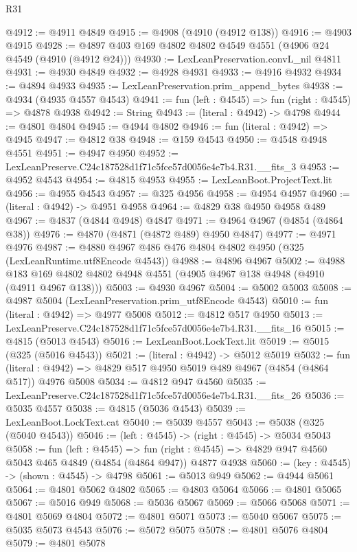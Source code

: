 \begin{lexlean}{R31}
\begin{coremodule}
@4912 := @4911 @4849
@4915 := @4908 (@4910 (@4912 @138))
@4916 := @4903 @4915
@4928 := @4897 @403 @169 @4802 @4802 @4549 @4551 (@4906 @24 @4549 (@4910 (@4912 @24)))
@4930 := LexLeanPreservation.convL_nil @4811
@4931 := @4930 @4849
@4932 := @4928 @4931
@4933 := @4916 @4932
@4934 := @4894 @4933
@4935 := LexLeanPreservation.prim_append_bytes
@4938 := @4934 (@4935 @4557 @4543)
@4941 := fun (left : @4545) => fun (right : @4545) => @4878 @4938
@4942 := String
@4943 := (literal : @4942) -> @4798
@4944 := @4801 @4804
@4945 := @4944 @4802
@4946 := fun (literal : @4942) => @4945
@4947 := @4812 @38
@4948 := @159 @4543
@4950 := @4548 @4948 @4551
@4951 := @4947 @4950
@4952 := LexLeanPreserve.C24c187528d1f71c5fce57d0056e4e7b4.R31.__fits_3
@4953 := @4952 @4543
@4954 := @4815 @4953
@4955 := LexLeanBoot.ProjectText.lit
@4956 := @4955 @4543
@4957 := @325 @4956
@4958 := @4954 @4957
@4960 := (literal : @4942) -> @4951 @4958
@4964 := @4829 @38 @4950 @4958 @489
@4967 := @4837 (@4844 @4948) @4847
@4971 := @4964 @4967 (@4854 (@4864 @38))
@4976 := @4870 (@4871 (@4872 @489) @4950 @4847)
@4977 := @4971 @4976
@4987 := @4880 @4967 @486 @476 @4804 @4802 @4950 (@325 (LexLeanRuntime.utf8Encode @4543))
@4988 := @4896 @4967
@5002 := @4988 @183 @169 @4802 @4802 @4948 @4551 (@4905 @4967 @138 @4948 (@4910 (@4911 @4967 @138)))
@5003 := @4930 @4967
@5004 := @5002 @5003
@5008 := @4987 @5004 (LexLeanPreservation.prim_utf8Encode @4543)
@5010 := fun (literal : @4942) => @4977 @5008
@5012 := @4812 @517 @4950
@5013 := LexLeanPreserve.C24c187528d1f71c5fce57d0056e4e7b4.R31.__fits_16
@5015 := @4815 (@5013 @4543)
@5016 := LexLeanBoot.LockText.lit
@5019 := @5015 (@325 (@5016 @4543))
@5021 := (literal : @4942) -> @5012 @5019
@5032 := fun (literal : @4942) => @4829 @517 @4950 @5019 @489 @4967 (@4854 (@4864 @517)) @4976 @5008
@5034 := @4812 @947 @4560
@5035 := LexLeanPreserve.C24c187528d1f71c5fce57d0056e4e7b4.R31.__fits_26
@5036 := @5035 @4557
@5038 := @4815 (@5036 @4543)
@5039 := LexLeanBoot.LockText.cat
@5040 := @5039 @4557
@5043 := @5038 (@325 (@5040 @4543))
@5046 := (left : @4545) -> (right : @4545) -> @5034 @5043
@5058 := fun (left : @4545) =>
  fun (right : @4545) => @4829 @947 @4560 @5043 @465 @4849 (@4854 (@4864 @947)) @4877 @4938
@5060 := (key : @4545) -> (shown : @4545) -> @4798
@5061 := @5013 @949
@5062 := @4944 @5061
@5064 := @4801 @5062 @4802
@5065 := @4803 @5064
@5066 := @4801 @5065
@5067 := @5016 @949
@5068 := @5036 @5067
@5069 := @5066 @5068
@5071 := @4801 @5069 @4804
@5072 := @4801 @5071
@5073 := @5040 @5067
@5075 := @5035 @5073 @4543
@5076 := @5072 @5075
@5078 := @4801 @5076 @4804
@5079 := @4801 @5078

\end{coremodule}
\end{lexlean}
